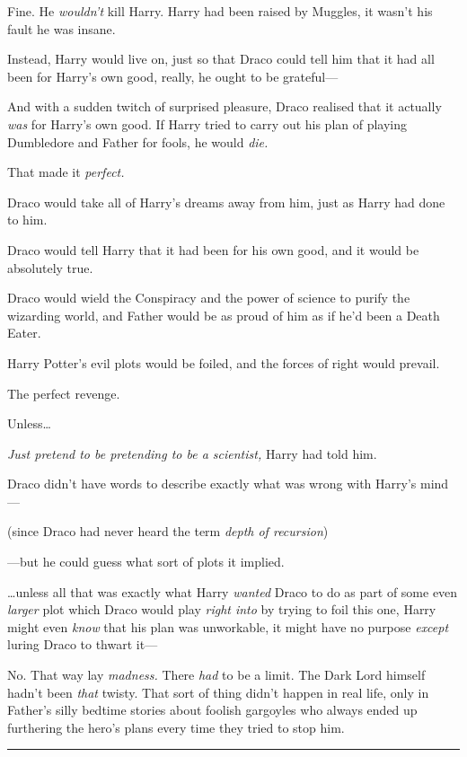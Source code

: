 Fine. He \emph{wouldn't} kill Harry. Harry had been raised by Muggles,
it wasn't his fault he was insane.

Instead, Harry would live on, just so that Draco could tell him that it
had all been for Harry's own good, really, he ought to be grateful---

And with a sudden twitch of surprised pleasure, Draco realised that it
actually \emph{was} for Harry's own good. If Harry tried to carry out
his plan of playing Dumbledore and Father for fools, he would
\emph{die.}

That made it \emph{perfect.}

Draco would take all of Harry's dreams away from him, just as Harry had
done to him.

Draco would tell Harry that it had been for his own good, and it would
be absolutely true.

Draco would wield the Conspiracy and the power of science to purify the
wizarding world, and Father would be as proud of him as if he'd been a
Death Eater.

Harry Potter's evil plots would be foiled, and the forces of right would
prevail.

The perfect revenge.

Unless\ldots{}

\emph{Just pretend to be pretending to be a scientist,} Harry had told
him.

Draco didn't have words to describe exactly what was wrong with Harry's
mind---

(since Draco had never heard the term \emph{depth of recursion})

---but he could guess what sort of plots it implied.

\ldots{}unless all that was exactly what Harry \emph{wanted} Draco to do
as part of some even \emph{larger} plot which Draco would play
\emph{right into} by trying to foil this one, Harry might even
\emph{know} that his plan was unworkable, it might have no purpose
\emph{except} luring Draco to thwart it---

No. That way lay \emph{madness.} There \emph{had} to be a limit. The
Dark Lord himself hadn't been \emph{that} twisty. That sort of thing
didn't happen in real life, only in Father's silly bedtime stories about
foolish gargoyles who always ended up furthering the hero's plans every
time they tried to stop him.

\begin{center}\rule{3in}{0.4pt}\end{center}

